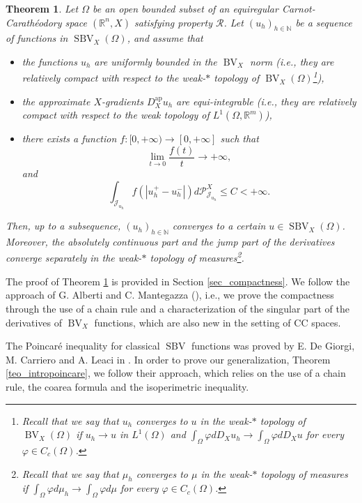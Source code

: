\documentclass[12pt,a4paper]{amsart}
\theoremstyle{definition}
\theoremstyle{plain}
\newtheorem{teo}[defi]{Theorem}
\newcommand{\N}{\mathbb{N}}
\newcommand{\vp}{\varphi}
\newcommand{\R}{\mathbb{R}}
\newcommand{\sbv}{\operatorname{SBV}}
\newcommand{\bv}{\operatorname{BV}}
\newcommand{\J}{\mathcal{J}}
\newcommand{\ap}{{\operatorname{ap}}}
\begin{document}
\begin{teo}\label{teo_introcompact}
Let $\Omega$ be an open bounded subset of an equiregular Carnot-Carathéodory space $(\R^n,X)$ satisfying property $\mathcal R$. Let $(u_h)_{h \in \N}$ be a sequence of functions in $\sbv_X(\Omega)$, and assume that 
    \begin{itemize}
        \item[(i)] the functions $u_h$ are uniformly bounded in the $\bv_X$ norm (i.e., they are relatively compact with respect to the weak-$*$ topology of $\bv_X(\Omega)$\footnote{Recall that we say that $u_h$ converges to $u$ in the weak-$*$ topology of $\bv_X(\Omega)$ if $u_h\to u$ in $L^1(\Omega)$ and $\int_\Omega \vp dD_Xu_h \to \int_\Omega \vp dD_Xu$ for every $\vp \in C_c(\Omega)$.}),
        \item[(ii)] the approximate $X$-gradients $D^\ap_Xu_h$ are equi-integrable (i.e., they are relatively compact with respect to the weak topology of $L^1(\Omega,\R^m)$),
        \item[(iii)] there exists a function $f:[0,+\infty) \to [0,+\infty]$ such that 
        \[
        \lim_{t \to 0} \frac{f(t)}{t}\to +\infty,
        \]
        and
        \[
        \int_{\J_{u_h}}f(|u^+_h-u^-_h|)d\mathcal{P}^X_{\J_{u_h}} \leq C <+\infty.
        \]
    \end{itemize}
    Then, up to a subsequence, $(u_h)_{h \in \N}$ converges to a certain $u \in \sbv_X(\Omega)$. Moreover, the absolutely continuous part and the jump part of the derivatives converge separately in the weak\nobreakdash-$*$ topology of measures\footnote{Recall that we say that $\mu_h$ converges to $\mu$ in the weak-$*$ topology of measures if $\int_\Omega \vp d \mu_h \to \int_\Omega \vp d\mu$ for every $\vp \in C_c(\Omega)$.}.
\end{teo}

The proof of Theorem \ref{teo_introcompact} is provided in Section \ref{sec_compactness}. We follow the approach of G. Alberti and C. Mantegazza (\cite{albertimantegazza}), i.e., we prove the compactness through the use of a chain rule and a characterization of the singular part of the derivatives of $\bv_X$ functions, which are also new in the setting of CC spaces.

The Poincaré inequality for classical $\sbv$ functions was proved by E. De Giorgi, M. Carriero and A. Leaci in \cite{dgcl}. In order to prove our generalization, Theorem \ref{teo_intropoincare}, we follow their approach, which relies on the use of a chain rule, the coarea formula and the isoperimetric inequality.
\end{document}
